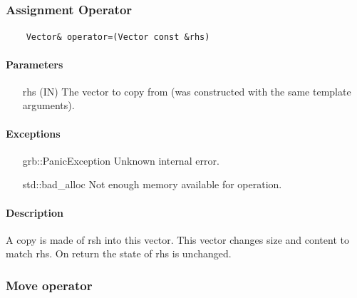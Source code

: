 {%
\subsubsection{Assignment Operator}

\paragraph{\syntax}

\begin{verbatim}
    Vector& operator=(Vector const &rhs)
\end{verbatim}

\paragraph{Parameters}

\begin{itemize}[leftmargin=1.1in]
    \item[{\sf rhs}] ({\sf IN}) The vector to copy from (was constructed with the same template arguments).
\end{itemize}

\paragraph{Exceptions}

\begin{itemize}[leftmargin=2.1in]
    \item[{\sf grb::PanicException}]   Unknown internal error.
    \item[{\sf std::bad\_alloc}]        Not enough memory available for operation.
\end{itemize}

\paragraph{Description}

A copy is made of {\sf rsh} into this vector.  This vector changes size and content to match {\sf rhs}.
On return the state of {\sf rhs} is unchanged.



\subsubsection{Move operator}

\paragraph{\syntax}

}
